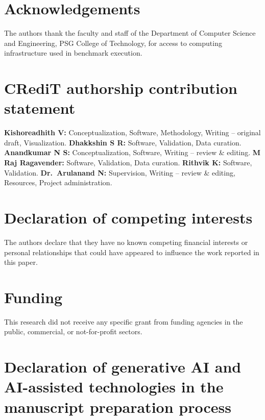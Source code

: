 \documentclass[5p,times]{elsarticle}
\begin{document}
\section*{Acknowledgements}

The authors thank the faculty and staff of the Department of Computer
Science and Engineering, PSG College of Technology, for access to
computing infrastructure used in benchmark execution.

\section*{CRediT authorship contribution statement}

\textbf{Kishoreadhith V:} Conceptualization, Software, Methodology,
Writing -- original draft, Visualization.
\textbf{Dhakkshin S R:} Software, Validation, Data curation.
\textbf{Anandkumar N S:} Conceptualization, Software, Writing --
review \& editing.
\textbf{M Raj Ragavender:} Software, Validation, Data curation.
\textbf{Rithvik K:} Software, Validation.
\textbf{Dr.\ Arulanand N:} Supervision, Writing -- review \& editing,
Resources, Project administration.

\section*{Declaration of competing interests}

The authors declare that they have no known competing financial interests
or personal relationships that could have appeared to influence the work
reported in this paper.

\section*{Funding}

This research did not receive any specific grant from funding agencies
in the public, commercial, or not-for-profit sectors.

\section*{Declaration of generative AI and AI-assisted technologies in
the manuscript preparation process}
\end{document}
